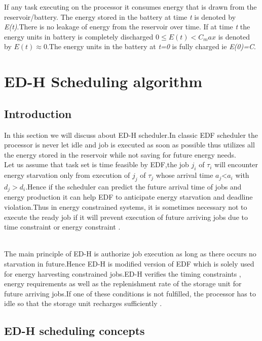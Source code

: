 \documentclass[12pt,hidelinks]{article}
\begin{document}
{If any task executing on the processor it consumes energy that is  drawn from the reservoir/battery.
The energy stored in the battery at time \textit{t} is denoted by \textit{E(t)}.There is no leakage of energy from the reservoir over time. If at time \textit{t} the energy units in battery is completely discharged $0 \leq E(t)<C_max$ is denoted by $E(t)\approx0$.The energy units in the battery at \textit{t=0} is fully charged ie \textit{E(0)=C}.

\newpage
\section{ED-H Scheduling algorithm}
\vspace{4cm}
\subsection{Introduction}
In this section we will discuss about ED-H scheduler.In classic EDF scheduler the processor is never let idle and job is executed as soon as possible thus utilizes all the energy stored in the reservoir while not saving for future energy needs.\newline
\\ Let us assume that task set is time feasible by EDF,the job $j_i$ of  $\tau_i$ will encounter energy starvation only from execution of $j_j$ of $\tau_j$ whose arrival time $a_j$<$a_i$ with $d_j > d_i$.Hence if the scheduler can predict the future arrival time of jobs and energy production it can help EDF to anticipate energy starvation and deadline violation.Thus in energy constrained systems, it is sometimes necessary not to execute the ready job if it will prevent execution of future arriving jobs due to time constraint or energy constraint \cite{EDH_ex}.\newline

\\ The main principle of ED-H is authorize job execution as long as there occurs no starvation in future.Hence ED-H is modified version of EDF which is solely used for energy harvesting constrained jobs.ED-H verifies the timing constraints , energy requirements as well as the replenishment rate of the storage unit for future arriving jobs.If one of these
conditions is not fulfilled, the processor has to idle so that
the storage unit recharges sufficiently \cite{EDH_ex1}.

\subsection{ED-H scheduling concepts}\newline
}
\end{document}
